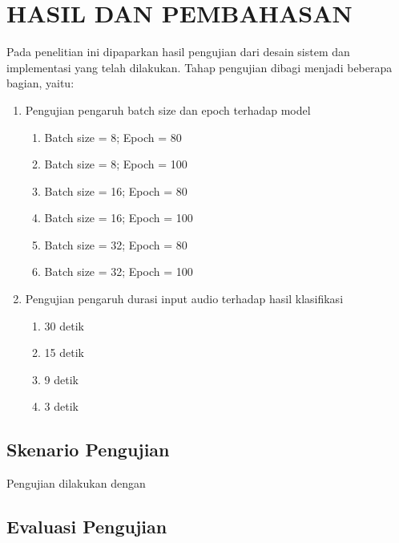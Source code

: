 \chapter{HASIL DAN PEMBAHASAN}
\label{chap:hasilpembahasan}


Pada penelitian ini dipaparkan hasil pengujian dari desain sistem dan implementasi yang telah dilakukan. Tahap pengujian dibagi menjadi beberapa bagian, yaitu:

\begin{enumerate}
	\item Pengujian pengaruh batch size dan epoch terhadap model
	\begin{enumerate}
		\item Batch size = 8; Epoch = 80
		\item Batch size = 8; Epoch = 100
		\item Batch size = 16; Epoch = 80
		\item Batch size = 16; Epoch = 100
		\item Batch size = 32; Epoch = 80
		\item Batch size = 32; Epoch = 100
	\end{enumerate}
	
	\item Pengujian pengaruh durasi input audio terhadap hasil klasifikasi
	\begin{enumerate}
		\item 30 detik
		\item 15 detik
		\item 9 detik
		\item 3 detik
	\end{enumerate}
	
\end{enumerate}


\section{Skenario Pengujian}
\label{sec:skenariopengujian}

Pengujian dilakukan dengan \lipsum[1-2]

\section{Evaluasi Pengujian}
\label{sec:analisispengujian}

